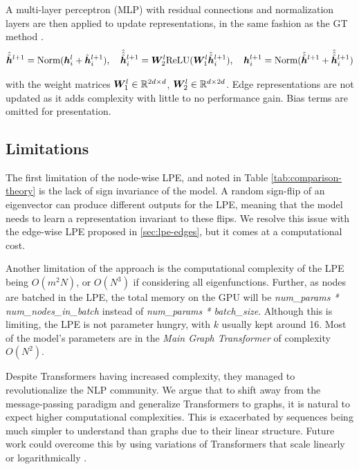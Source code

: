 \documentclass{article}
\begin{document}
A multi-layer perceptron (MLP) with residual connections and normalization layers are then applied to update representations, in the same fashion as the GT method \cite{dwivedi2020generalization}.
\vspace{-4pt}
\begin{equation}
    \hat{\hat{{\bm{h}}}}^{l+1} = \textnormal{Norm}({\bm{h}}_i^l + \hat{{\bm{h}}}_i^{l+1} ),
    \quad
    \hat{\hat{\hat{{\bm{h}}}}}_i^{l+1}={\bm{W}}_2^l\textnormal{ReLU}({\bm{W}}_1^l\hat{\hat{{\bm{h}}}}_i^{l+1}),
    \quad
    {\bm{h}}_i^{l+1} = \textnormal{Norm}(   \hat{\hat{{\bm{h}}}}^{l+1} +  \hat{\hat{\hat{{\bm{h}}}}}_i^{l+1})
\end{equation}

with the weight matrices ${\bm{W}}_1^l \in \mathbb{R}^{2d \times d}$, ${\bm{W}}_2^l \in \mathbb{R}^{d \times 2d}$. Edge representations are not updated as it adds complexity with little to no performance gain. Bias terms are omitted for presentation.


\subsection{Limitations}
\label{sec:limitations}

The first limitation of the node-wise LPE, and noted in Table \ref{tab:comparison-theory} is the lack of sign invariance of the model. A random sign-flip of an eigenvector can produce different outputs for the LPE, meaning that the model needs to learn a representation invariant to these flips. We resolve this issue with the edge-wise LPE proposed in \ref{sec:lpe-edges}, but it comes at a computational cost.

Another limitation of the approach is the computational complexity of the LPE being $O(m^2 N)$, or $O(N^3)$ if considering all eigenfunctions. Further, as nodes are batched in the LPE, the total memory on the GPU will be \textit{num\_params * num\_nodes\_in\_batch} instead of \textit{num\_params * batch\_size}. Although this is limiting, the LPE is not parameter hungry, with $k$ usually kept around 16. Most of the model's parameters are in the \textit{Main Graph Transformer} of complexity $O(N^2)$.

Despite Transformers having increased complexity, they managed to revolutionalize the NLP community. We argue that to shift away from the message-passing paradigm and generalize Transformers to graphs, it is natural to expect higher computational complexities. This is exacerbated by sequences being much simpler to understand than graphs due to their linear structure. Future work could overcome this by using variations of Transformers that scale linearly or logarithmically \cite{tay_efficient_2020}.
\end{document}
